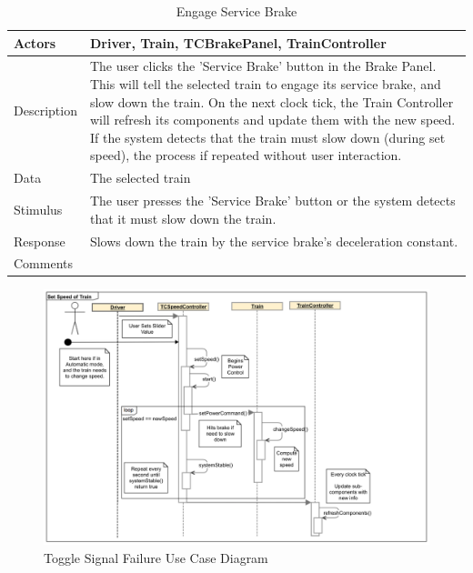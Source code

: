\documentclass[]{article}
\begin{document}
\begin{table}[H]
	\centering
	\caption{Engage Service Brake}
	\begin{tabular}{|l|l|}
		\hline
		Actors & \parbox[t]{10cm}{Driver, Train, TCBrakePanel, TrainController} \\ \hline
		Description & \parbox[t]{10cm}{The user clicks the 'Service Brake' button in the Brake Panel. This will tell the selected train to engage its service brake, and slow down the train. On the next clock tick, the Train Controller will refresh its components and update them with the new speed. If the system detects that the train must slow down (during set speed), the process if repeated without user interaction. } \\ \hline
		Data &  \parbox[t]{10cm}{The selected train} \\ \hline
		Stimulus &  \parbox[t]{10cm}{ The user presses the 'Service Brake' button or the system detects that it must slow down the train. } \\ \hline
		Response & \parbox[t]{10cm}{Slows down the train by the service brake's deceleration constant. }\\ \hline
		Comments & \parbox[t]{10cm}{}  \\ \hline
	\end{tabular}
\end{table}

\begin{figure}[H]
	\centering
	\includegraphics[scale=.3]{tc_setSpeed_usecase}
	\caption{Toggle Signal Failure Use Case Diagram}
\end{figure}
\end{document}
